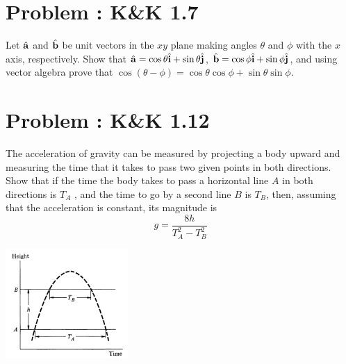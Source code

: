 \documentclass[problems]{esg8012pset}
\providecommand{\uvec}[1]{{\hat{\bf{#1}}}}
\begin{document}
\section{Problem \thesection: K\&K 1.7}
  Let $\uvec a$ and $\uvec b$ be unit vectors in the $xy$ plane making angles $\theta$ and $\phi$ with the $x$ axis,
  respectively. Show that $\uvec a = \cos\theta\uvec i + \sin\theta\uvec j$, $\uvec b = \cos\phi\uvec i + \sin\phi\uvec j$, and using vector algebra prove
that $\cos(\theta -\phi ) = \cos\theta \cos\phi + \sin\theta \sin\phi$.
\section{Problem \thesection: K\&K 1.12}
  The acceleration of gravity can be measured by projecting a body upward and measuring the
  time that it takes to pass two given points in both directions. Show that if the time the body takes
  to pass a horizontal line $A$ in both directions is $T_A$ , and the time to go by a second line $B$ is $T_B$,
  then, assuming that the acceleration is constant, its magnitude is
  $$g = \frac{8h}{T_A^2 - T_B^2}$$
  \begin{center}\includegraphics[width=0.35\textwidth]{ps01_1}\end{center}
\end{document}
